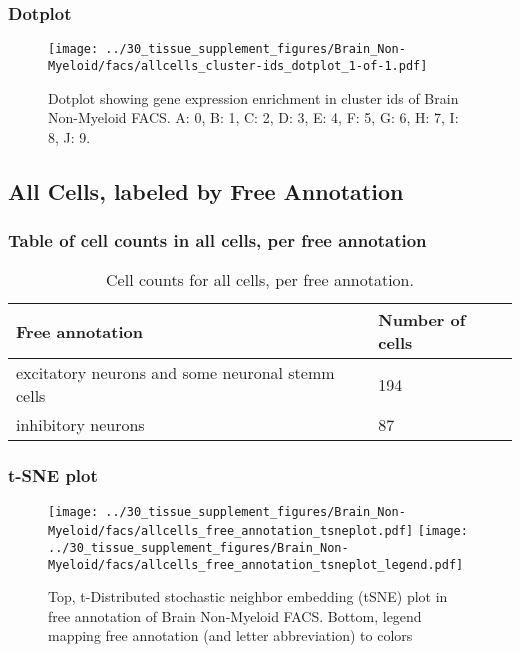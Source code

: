 \newpage
\newpage
\subsubsection{Dotplot}
\begin{figure}[h]
\centering
\texttt{[image: ../30\_tissue\_supplement\_figures/Brain\_Non-Myeloid/facs/allcells\_cluster-ids\_dotplot\_1-of-1.pdf]}

\caption{ Dotplot  showing gene expression enrichment in cluster ids of Brain Non-Myeloid FACS. A: 0, B: 1, C: 2, D: 3, E: 4, F: 5, G: 6, H: 7, I: 8, J: 9.}
\end{figure}


\newpage
\subsection{All Cells, labeled by Free Annotation}
\subsubsection{Table of cell counts in all cells, per free annotation}\begin{table}[h]
\centering
\label{my-label}
\begin{tabular}{@{}ll@{}}
\toprule

Free annotation& Number of cells \\ \midrule
excitatory neurons and some neuronal stemm cells & 194 \\

inhibitory neurons & 87 \\
\bottomrule
\end{tabular}
\caption{Cell counts for all cells, per free annotation.}
\end{table}

\newpage
\subsubsection{t-SNE plot}
\begin{figure}[h]
\centering
\texttt{[image: ../30\_tissue\_supplement\_figures/Brain\_Non-Myeloid/facs/allcells\_free\_annotation\_tsneplot.pdf]}
\texttt{[image: ../30\_tissue\_supplement\_figures/Brain\_Non-Myeloid/facs/allcells\_free\_annotation\_tsneplot\_legend.pdf]}
\caption{Top, t-Distributed stochastic neighbor embedding (tSNE) plot  in free annotation of Brain Non-Myeloid FACS. Bottom, legend mapping free annotation (and letter abbreviation) to colors}
\end{figure}


